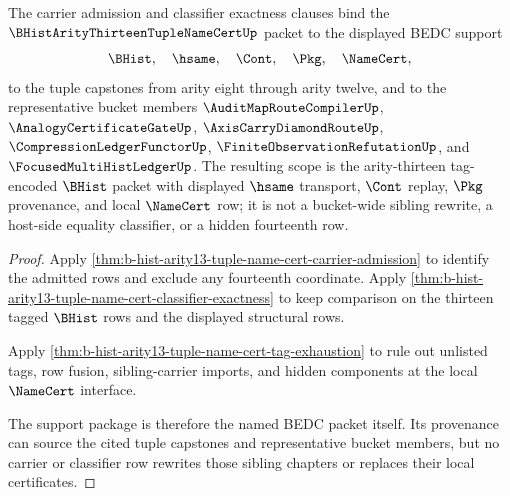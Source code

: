 \begin{theorem}
\label{thm:b-hist-arity13-tuple-name-cert-scoped-support-package}
The carrier admission and classifier exactness clauses bind the $\BHistArityThirteenTupleNameCertUp$ packet to the displayed BEDC support
$$
\BHist,\quad \hsame,\quad \Cont,\quad \Pkg,\quad \NameCert,
$$
to the tuple capstones from arity eight through arity twelve, and to the representative bucket members $\AuditMapRouteCompilerUp$, $\AnalogyCertificateGateUp$, $\AxisCarryDiamondRouteUp$, $\CompressionLedgerFunctorUp$, $\FiniteObservationRefutationUp$, and $\FocusedMultiHistLedgerUp$. The resulting scope is the arity-thirteen tag-encoded $\BHist$ packet with displayed $\hsame$ transport, $\Cont$ replay, $\Pkg$ provenance, and local $\NameCert$ row; it is not a bucket-wide sibling rewrite, a host-side equality classifier, or a hidden fourteenth row.
\end{theorem}
\begin{proof}
Apply \autoref{thm:b-hist-arity13-tuple-name-cert-carrier-admission} to identify the admitted rows and exclude any fourteenth coordinate. Apply \autoref{thm:b-hist-arity13-tuple-name-cert-classifier-exactness} to keep comparison on the thirteen tagged $\BHist$ rows and the displayed structural rows.

Apply \autoref{thm:b-hist-arity13-tuple-name-cert-tag-exhaustion} to rule out unlisted tags, row fusion, sibling-carrier imports, and hidden components at the local $\NameCert$ interface.

The support package is therefore the named BEDC packet itself. Its provenance can source the cited tuple capstones and representative bucket members, but no carrier or classifier row rewrites those sibling chapters or replaces their local certificates.
\end{proof}



